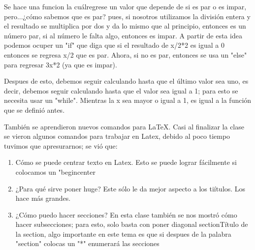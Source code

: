 \documentclass[letterpaper, 12pt, oneside]{article}
\begin{document}
	 Se hace una funcion la cuálregrese un valor que depende de si es par o es impar, pero...¿cómo sabemos que es par? pues, si nosotros utilizamos la división entera y el resultado se multiplica por dos y da lo mismo que al principio, entonces es un número par, si al número le falta algo, entonces es impar.
	 A partir de esta idea podemos ocuper un "if" que diga que si el resultado de x/2*2 es igual a 0 entonces se regresa x/2 que es par.
	 Ahora, si no es par, entonces se usa un "else" para regresar 3x*2 (ya que es impar).
	 
	 Despues de esto, debemos seguir calculando hasta que el último valor sea uno, es decir, debemos seguir calculando hasta que el valor sea igual a 1; para esto se necesita usar un "while".
	 Mientras la x sea mayor o igual a 1, es igual a la función que se definió antes.
	 
	 También se aprendieron nuevos comandos para LaTeX. Casi al finalizar la clase se vieron algunos comandos para trabajar en Latex, debido al poco tiempo tuvimos que apresurarnos; se vió que:
	 \begin{enumerate}
	 	\item 
	 	Cómo se puede centrar texto en Latex. Esto se puede lograr fácilmente si colocamos un "begin{center}
	 	\item 
	 	¿Para qué sirve poner huge? Este sólo le da mejor aspecto a los tiítulos. Los hace más grandes.
	 	\item 
	 	¿Cómo puedo hacer secciones? En esta clase también se nos mostró cómo hacer subsecciones; para esto, solo basta con poner diagonal section{Título de la section}, algo importante en este tema es que si despues de la palabra "section" colocas un "*"  enumerará las secciones
	 \end{enumerate}
 	
\end{document}

